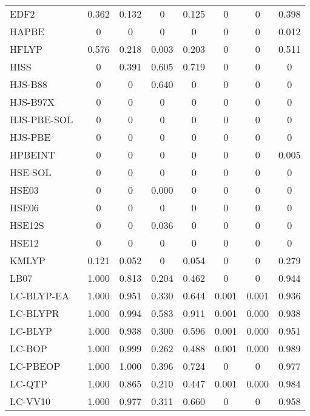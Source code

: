 \begin{table*}
\begin{tabular}{|l|c|c|c|c|c|c|c|}
EDF2~\cite{Lin2004_365} & 0.362 & 0.132 & 0 & 0.125 & 0 & 0 & 0.398 \\
HAPBE~\cite{Fabiano2015_122} & 0 & 0 & 0 & 0 & 0 & 0 & 0.012 \\
HFLYP~\cite{Lee1988_785,Miehlich1989_200} & 0.576 & 0.218 & 0.003 & 0.203 & 0 & 0 & 0.511 \\
HISS~\cite{Henderson2007_221103} & 0 & 0.391 & 0.605 & 0.719 & 0 & 0 & 0 \\
HJS-B88~\cite{Henderson2008_194105} & 0 & 0 & 0.640 & 0 & 0 & 0 & 0 \\
HJS-B97X~\cite{Henderson2008_194105} & 0 & 0 & 0 & 0 & 0 & 0 & 0 \\
HJS-PBE-SOL~\cite{Henderson2008_194105} & 0 & 0 & 0 & 0 & 0 & 0 & 0 \\
HJS-PBE~\cite{Henderson2008_194105} & 0 & 0 & 0 & 0 & 0 & 0 & 0 \\
HPBEINT~\cite{Fabiano2013_673} & 0 & 0 & 0 & 0 & 0 & 0 & 0.005 \\
HSE-SOL~\cite{Schimka2011_024116} & 0 & 0 & 0 & 0 & 0 & 0 & 0 \\
HSE03~\cite{Heyd2003_8207,Heyd2003_8207_err} & 0 & 0 & 0.000 & 0 & 0 & 0 & 0 \\
HSE06~\cite{Heyd2003_8207,Heyd2003_8207_err,Krukau2006_224106} & 0 & 0 & 0 & 0 & 0 & 0 & 0 \\
HSE12S~\cite{Moussa2012_204117} & 0 & 0 & 0.036 & 0 & 0 & 0 & 0 \\
HSE12~\cite{Moussa2012_204117} & 0 & 0 & 0 & 0 & 0 & 0 & 0 \\
KMLYP~\cite{Kang2001_11040} & 0.121 & 0.052 & 0 & 0.054 & 0 & 0 & 0.279 \\
LB07~\cite{Livshits2007_2932} & 1.000 & 0.813 & 0.204 & 0.462 & 0 & 0 & 0.944 \\
LC-BLYP-EA~\cite{Anderson2017_1656,Tawada2004_8425} & 1.000 & 0.951 & 0.330 & 0.644 & 0.001 & 0.001 & 0.936 \\
LC-BLYPR~\cite{Ai2021_1207} & 1.000 & 0.994 & 0.583 & 0.911 & 0.001 & 0.000 & 0.938 \\
LC-BLYP~\cite{Tawada2004_8425} & 1.000 & 0.938 & 0.300 & 0.596 & 0.001 & 0.000 & 0.951 \\
LC-BOP~\cite{Song2007_154105} & 1.000 & 0.999 & 0.262 & 0.488 & 0.001 & 0.000 & 0.989 \\
LC-PBEOP~\cite{Tawada2004_8425} & 1.000 & 1.000 & 0.396 & 0.724 & 0 & 0 & 0.977 \\
LC-QTP~\cite{Haiduke2018_184106} & 1.000 & 0.865 & 0.210 & 0.447 & 0.001 & 0.000 & 0.984 \\
LC-VV10~\cite{Vydrov2010_244103} & 1.000 & 0.977 & 0.311 & 0.660 & 0 & 0 & 0.958 \\
\bottomrule
\end{tabular}
\end{table*}
